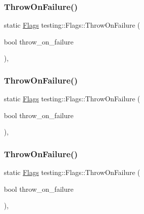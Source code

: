\mbox{\label{structtesting_1_1_flags_ad856df862414ed0dadf80b5e03829cc7}} 
\subsubsection{\texorpdfstring{ThrowOnFailure()}{ThrowOnFailure()}\hspace{0.1cm}{\footnotesize\ttfamily [1/3]}}
{\footnotesize\ttfamily static \mbox{\hyperlink{structtesting_1_1_flags}{Flags}} testing\+::\+Flags\+::\+Throw\+On\+Failure (\begin{DoxyParamCaption}\item[{bool}]{throw\+\_\+on\+\_\+failure }\end{DoxyParamCaption})\hspace{0.3cm}{\ttfamily [inline]}, {\ttfamily [static]}}

\mbox{\label{structtesting_1_1_flags_ad856df862414ed0dadf80b5e03829cc7}} 
\subsubsection{\texorpdfstring{ThrowOnFailure()}{ThrowOnFailure()}\hspace{0.1cm}{\footnotesize\ttfamily [2/3]}}
{\footnotesize\ttfamily static \mbox{\hyperlink{structtesting_1_1_flags}{Flags}} testing\+::\+Flags\+::\+Throw\+On\+Failure (\begin{DoxyParamCaption}\item[{bool}]{throw\+\_\+on\+\_\+failure }\end{DoxyParamCaption})\hspace{0.3cm}{\ttfamily [inline]}, {\ttfamily [static]}}

\mbox{\label{structtesting_1_1_flags_ad856df862414ed0dadf80b5e03829cc7}} 
\subsubsection{\texorpdfstring{ThrowOnFailure()}{ThrowOnFailure()}\hspace{0.1cm}{\footnotesize\ttfamily [3/3]}}
{\footnotesize\ttfamily static \mbox{\hyperlink{structtesting_1_1_flags}{Flags}} testing\+::\+Flags\+::\+Throw\+On\+Failure (\begin{DoxyParamCaption}\item[{bool}]{throw\+\_\+on\+\_\+failure }\end{DoxyParamCaption})\hspace{0.3cm}{\ttfamily [inline]}, {\ttfamily [static]}}



